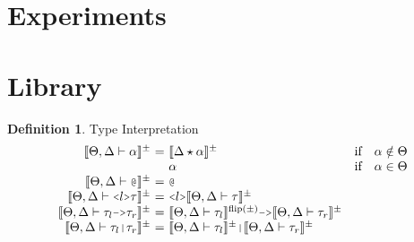 \documentclass[acmsmall]{acmart}
\theoremstyle{definition}
\newtheorem{definition}{Definition}[section]
\begin{document}


\section{Experiments}
\label{sec:experiments}





\section{Library}
\label{sec:library}

\begin{definition} 
  \label{def:type_interpretation}
  Type Interpretation 
  \hfill
  \\
  \[
  \begin{array}[t]{r@{}c@{}lcl}
      \llbracket \Theta, \Delta \entails \alpha \rrbracket^\pm 
      &\ =\ & 
      \llbracket \Delta \star  \alpha \rrbracket^\pm
      &\text{if}& 
      \alpha \notin \Theta

      \\

      &&
      \alpha
      &\text{if}&
      \alpha \in \Theta

      \\

      \llbracket \Theta, \Delta \entails \J{@} \rrbracket^\pm 
      &\ =\ & 
      \J{@}
      &&

      \\

      \llbracket \Theta, \Delta \entails \J{<}l\J{>}\tau \rrbracket^\pm
      &\ =\ & 
      \J{<}l\J{>}\llbracket \Theta, \Delta \entails \tau \rrbracket^\pm

      \\

      \llbracket \Theta, \Delta \entails \tau_l\J{->}\tau_r \rrbracket^\pm 
      &\ =\ & 
      \llbracket \Theta, \Delta \entails \tau_l \rrbracket^{\text{flip}(\pm)}
      \J{->}
      \llbracket \Theta, \Delta \entails \tau_r \rrbracket^\pm

      \\

      \llbracket \Theta, \Delta \entails \tau_l\J{|}\tau_r \rrbracket^\pm
      &\ =\ & 
      \llbracket \Theta, \Delta \entails \tau_l \rrbracket^\pm
      \J{|}
      \llbracket \Theta, \Delta \entails \tau_r \rrbracket^{\pm}


\end{array}\]
\end{definition}
\end{document}
